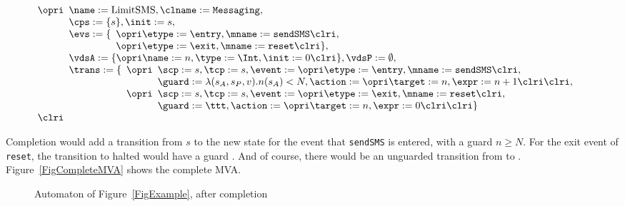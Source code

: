 \[
\begin{array}[t]{l}
\opri 
\begin{array}[t]{l}
\name := \textrm{LimitSMS}, \clname := \texttt{Messaging},\\
\cps := \{s\},
\init := s,\\
\evs := \{
\begin{array}[t]{l}
\opri \etype := \entry, \mname := \texttt{sendSMS} \clri,\\
\opri \etype := \exit, \mname := \texttt{reset} \clri\},
\end{array}
\\
\vdsA := \{\opri \name := n, \type := \Int, \init := 0 \clri\},
\vdsP := \emptyset,\\
\trans := \{
\begin{array}[t]{l}
\opri 
 \begin{array}[t]{l}
\scp := s, \tcp := s, 
             \event := \opri \etype := \entry, 
                             \mname := \texttt{sendSMS} \clri, \\
             \guard := \lambda(s_A, s_P, v). n(s_A) < N,
             \action := \opri \target := n, \expr := n + 1 \clri 
            \clri,
\end{array}\\
\opri 
\begin{array}[t]{l}
\scp := s, \tcp := s,
             \event := \opri \etype := \exit, \mname := \texttt{reset}
\clri, \\
             \guard := \ttt, 
             \action := \opri \target := n, \expr := 0 \clri
           \clri \}
\end{array}
\end{array}
\end{array}\\
\clri
\end{array}
\]

Completion would add a transition from \(s\) to the new state \halted
for the event that \texttt{sendSMS} is entered, with a guard \(n \geq
N\). For the exit event of \texttt{reset}, the transition to halted
would have a guard \fff. And of course, there would be an unguarded
transition from \halted to \halted. Figure~\ref{FigCompleteMVA} shows
the complete MVA. 
 
\begin{figure}[t]
\begin{center}
\end{center}
\caption{Automaton of Figure~\ref{FigExample}, after completion}
\end{figure}
